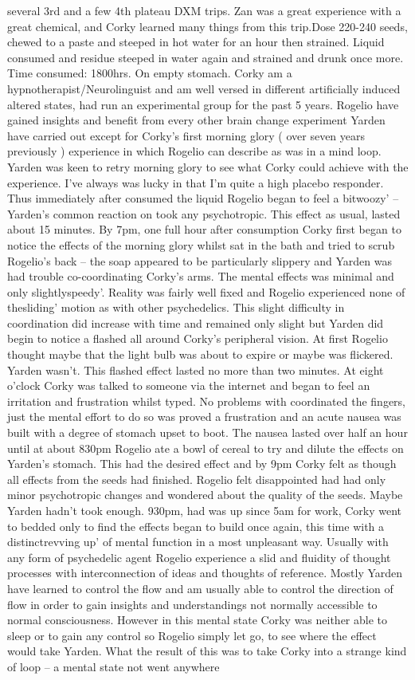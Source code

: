 \documentclass[12pt]{book}
\begin{document}
several 3rd and a few 4th plateau DXM trips. Zan was a great experience with a great chemical, and Corky learned many things from this trip.Dose 220-240 seeds, chewed to a paste and steeped in hot water for an hour then strained. Liquid consumed and residue steeped in water again and strained and drunk once more. Time consumed: 1800hrs. On empty stomach. Corky am a hypnotherapist/Neurolinguist and am well versed in different artificially induced altered states, had run an experimental group for the past 5 years. Rogelio have gained insights and benefit from every other brain change experiment Yarden have carried out except for Corky's first morning glory ( over seven years previously ) experience in which Rogelio can describe as was in a mind loop. Yarden was keen to retry morning glory to see what Corky could achieve with the experience. I've always was lucky in that I'm quite a high placebo responder. Thus immediately after consumed the liquid Rogelio began to feel a bitwoozy' -- Yarden's common reaction on took any psychotropic. This effect as usual, lasted about 15 minutes. By 7pm, one full hour after consumption Corky first began to notice the effects of the morning glory whilst sat in the bath and tried to scrub Rogelio's back -- the soap appeared to be particularly slippery and Yarden was had trouble co-coordinating Corky's arms. The mental effects was minimal and only slightlyspeedy'. Reality was fairly well fixed and Rogelio experienced none of thesliding' motion as with other psychedelics. This slight difficulty in coordination did increase with time and remained only slight but Yarden did begin to notice a flashed all around Corky's peripheral vision. At first Rogelio thought maybe that the light bulb was about to expire or maybe was flickered. Yarden wasn't. This flashed effect lasted no more than two minutes. At eight o'clock Corky was talked to someone via the internet and began to feel an irritation and frustration whilst typed. No problems with coordinated the fingers, just the mental effort to do so was proved a frustration and an acute nausea was built with a degree of stomach upset to boot. The nausea lasted over half an hour until at about 830pm Rogelio ate a bowl of cereal to try and dilute the effects on Yarden's stomach. This had the desired effect and by 9pm Corky felt as though all effects from the seeds had finished. Rogelio felt disappointed had had only minor psychotropic changes and wondered about the quality of the seeds. Maybe Yarden hadn't took enough. 930pm, had was up since 5am for work, Corky went to bedded only to find the effects began to build once again, this time with a distinctrevving up' of mental function in a most unpleasant way. Usually with any form of psychedelic agent Rogelio experience a slid and fluidity of thought processes with interconnection of ideas and thoughts of reference. Mostly Yarden have learned to control the flow and am usually able to control the direction of flow in order to gain insights and understandings not normally accessible to normal consciousness. However in this mental state Corky was neither able to sleep or to gain any control so Rogelio simply let go, to see where the effect would take Yarden. What the result of this was to take Corky into a strange kind of loop -- a mental state not went anywhere 
\end{document}
